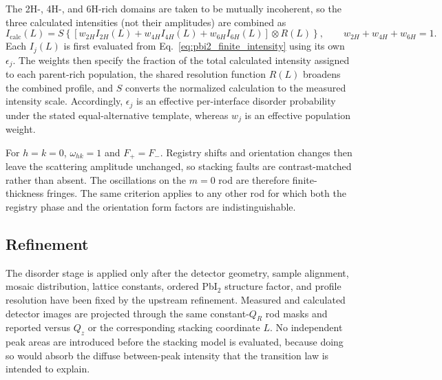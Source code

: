 The 2H-, 4H-, and 6H-rich domains are taken to be mutually incoherent, so the
three calculated intensities (not their amplitudes) are combined as
\begin{equation}
  I_{\mathrm{calc}}(L)=S\left\{\left[
  w_{2H}I_{2H}(L)+w_{4H}I_{4H}(L)+w_{6H}I_{6H}(L)
  \right]\!\otimes R(L)\right\},
  \qquad w_{2H}+w_{4H}+w_{6H}=1.
  \label{eq:pbi2_population_sum}
\end{equation}
Each $I_j(L)$ is first evaluated from
Eq.~\eqref{eq:pbi2_finite_intensity} using its own $\epsilon_j$.  The weights
then specify the fraction of the total calculated intensity assigned to each
parent-rich population, the shared resolution function $R(L)$ broadens the
combined profile, and $S$ converts the normalized calculation to the measured
intensity scale.  Accordingly, $\epsilon_j$ is an effective per-interface
disorder probability under the stated equal-alternative template, whereas
$w_j$ is an effective population weight.

For $h=k=0$, $\omega_{hk}=1$ and $F_+=F_-$.  Registry shifts and orientation
changes then leave the scattering amplitude unchanged, so stacking faults are
contrast-matched rather than absent.  The oscillations on the $m=0$ rod are
therefore finite-thickness fringes.  The same criterion applies to any other
rod for which both the registry phase and the orientation form factors are
indistinguishable.

\subsection{Refinement}

The disorder stage is applied only after the detector geometry, sample
alignment, mosaic distribution, lattice constants, ordered PbI$_2$ structure
factor, and profile resolution have been fixed by the upstream refinement.
Measured and calculated detector images are projected through the same
constant-$Q_R$ rod masks and reported versus $Q_z$ or the corresponding
stacking coordinate $L$.  No independent peak areas are introduced before the
stacking model is evaluated, because doing so would absorb the diffuse
between-peak intensity that the transition law is intended to explain.

